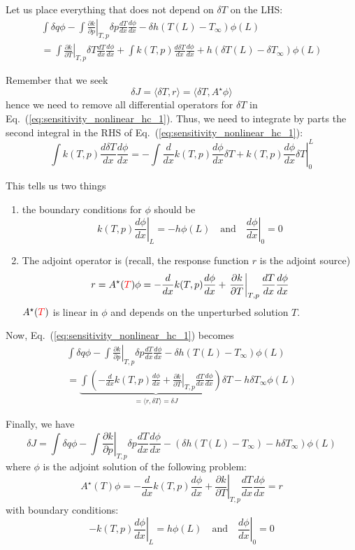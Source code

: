 \documentclass[11pt]{article}
\newcommand{\eqt}[1]{Eq.~(\ref{#1})}                     %
\newcommand{\be}{\begin{equation}}
\newcommand{\ee}{\end{equation}}
\newcommand{\tcr}[1]{\textcolor{red}{#1}}
\begin{document}
Let us place everything that does not depend on $\delta T$ on the LHS:
\begin{multline}
\label{eq:sensitivity_nonlinear_hc_1}
\int \delta q\phi 
-\int \left.\frac{\partial k}{\partial p}\right|_{T,p}\delta p \frac{dT}{dx}\frac{d\phi}{dx} 
-\delta h(T(L)-T_\infty)  \phi(L)
\\=
\int \left.\frac{\partial k}{\partial T}\right|_{T,p}\delta T \frac{dT}{dx}\frac{d\phi}{dx} 
+ \int k(T,p)\frac{d\delta T}{dx}\frac{d\phi}{dx} 
+h(\delta T(L)-\delta T_\infty)  \phi(L)
\end{multline}

Remember that we seek 
\[
\delta J = \langle \delta T, r \rangle = \langle \delta T, A^\star \phi \rangle 
\]
hence we need to remove all differential operators for $\delta T$ in \eqt{eq:sensitivity_nonlinear_hc_1}. Thus, we need to integrate by parts the second integral in the RHS of \eqt{eq:sensitivity_nonlinear_hc_1}:
\[
\int k(T,p)\frac{d\delta T}{dx}\frac{d\phi}{dx} 
=
-\int \frac{d}{dx}k(T,p)\frac{d\phi}{dx} \delta T + \left.k(T,p)\frac{d\phi}{dx}\delta T\right|_0^L
\]

This tells us two things
\begin{enumerate}
\item the boundary conditions for $\phi$ should be
\[
\left.k(T,p)\frac{d\phi}{dx}\right|_L = -h\phi(L) \quad \text{and} \quad \left.\frac{d\phi}{dx}\right|_0 = 0
\]
\item The adjoint operator is (recall, the response function $r$ is the adjoint source)
\[
r=A^\star(\tcr{T}) \phi  = -\frac{d}{dx}k(T,p)\frac{d\phi}{dx} + \left.\frac{\partial k}{\partial T}\right|_{T,p} \frac{dT}{dx}\frac{d\phi}{dx} 
\]
$A^\star(\tcr{T})$ is linear in $\phi$ and depends on the unperturbed solution $T$.
\end{enumerate}

Now, \eqt{eq:sensitivity_nonlinear_hc_1} becomes
\begin{multline}
\int \delta q\phi 
-\int \left.\frac{\partial k}{\partial p}\right|_{T,p}\delta p \frac{dT}{dx}\frac{d\phi}{dx} 
-\delta h(T(L)-T_\infty)  \phi(L)
\\=
\underbrace{
\int \left(
- \frac{d}{dx}k(T,p)\frac{d\phi}{dx} 
+ \left.\frac{\partial k}{\partial T}\right|_{T,p} \frac{dT}{dx}\frac{d\phi}{dx} 
\right) 
\delta T 
}
_{=\langle r,\delta T \rangle = \delta J}
-h\delta T_\infty \phi(L)
\end{multline}

Finally, we have
\be
\boxed{
\delta J = 
\int \delta q\phi 
-\int \left.\frac{\partial k}{\partial p}\right|_{T,p}\delta p \frac{dT}{dx}\frac{d\phi}{dx} 
-\left(\delta h(T(L)-T_\infty)  - h\delta T_\infty \right)\phi(L)
}
\ee
where $\phi$ is the adjoint solution of the following problem:
\[
A^\star(T) \phi  = -\frac{d}{dx}k(T,p)\frac{d\phi}{dx} + \left.\frac{\partial k}{\partial T}\right|_{T,p} \frac{dT}{dx}\frac{d\phi}{dx} = r
\]
with boundary conditions:
\[
-\left.k(T,p)\frac{d\phi}{dx}\right|_L = h\phi(L) \quad \text{and} \quad \left.\frac{d\phi}{dx}\right|_0 = 0
\]
\end{document}
